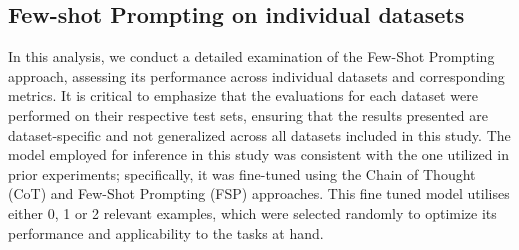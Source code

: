 \documentclass[logo,msc]{infthesis}           %
\begin{document}
\begin{comment}
\textbf{Key observations:}
\begin{itemize}
 \item Llama3-8B baseline outperforms Llama2-7B chat baseline across all metrics, indicating that the newer architecture has inherently better number handling capabilities.
 \item The performance gap is particularly noticeable in Average Permissive Accuracy (0.33 vs. 0.27) and Average Exact Accuracy (0.05 vs. 0.02).
\end{itemize}
\subsection{Impact of Fine-tuning}
\textbf{Fine-tuning significantly improved the performance of both model architectures:}
\begin{itemize}

\item Llama2-7B chat: Average Permissive Accuracy increased from 0.27 to 0.46
\item Llama3-8B: Average Permissive Accuracy increased from 0.33 to 0.67

The fine-tuned Llama3-8B model showed the best overall performance, with notable improvements in ROUGE Score (0.36) and METEOR Score (0.31).
\end{itemize}
\end{comment}
\subsection{Few-shot Prompting on individual datasets} 
In this analysis, we conduct a detailed examination of the Few-Shot Prompting approach, assessing its performance across individual datasets and corresponding metrics. It is critical to emphasize that the evaluations for each dataset were performed on their respective test sets, ensuring that the results presented are dataset-specific and not generalized across all datasets included in this study. The model employed for inference in this study was consistent with the one utilized in prior experiments; specifically, it was fine-tuned using the Chain of Thought (CoT) and Few-Shot Prompting (FSP) approaches. This fine tuned model utilises either 0, 1 or 2 relevant examples, which were selected randomly to optimize its performance and applicability to the tasks at hand.
\end{document}
